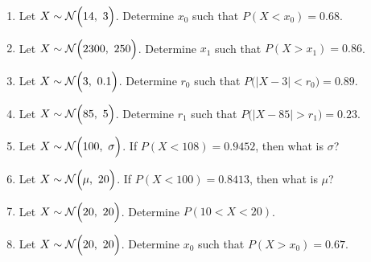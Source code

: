 \documentclass[12pt,letterpaper]{article}
\begin{document}
\begin{enumerate}
\item Let $X \sim \mathcal{N}\Big(14,~ 3\Big)$. Determine $x_0$ such that $P(X<x_0) = 0.68$.
\vfill
\item Let $X \sim \mathcal{N}\Big(2300,~ 250\Big)$. Determine $x_1$ such that $P(X>x_1) = 0.86$.
\vfill
\item Let $X \sim \mathcal{N}\Big(3,~ 0.1\Big)$. Determine $r_0$ such that $P\Big(\big|X-3\big|<r_0\Big) = 0.89$.
\vfill
\item Let $X \sim \mathcal{N}\Big(85,~ 5\Big)$. Determine $r_1$ such that $P\Big(\big|X-85\big|>r_1\Big) = 0.23$.
\vfill

\newpage

\item Let $X \sim \mathcal{N}\Big(100,~ \sigma\Big)$. If $P(X<108) = 0.9452$, then what is $\sigma$?
\vfill
\item Let $X \sim \mathcal{N}\Big(\mu,~ 20\Big)$. If $P(X<100) = 0.8413$, then what is $\mu$?
\vfill
\item Let $X \sim \mathcal{N}\Big(20,~ 20\Big)$. Determine $P(10<X<20)$.
\vfill
\item Let $X \sim \mathcal{N}\Big(20,~ 20\Big)$. Determine $x_0$ such that $P(X>x_0) = 0.67$.
\vfill


\end{enumerate}
\end{document}
